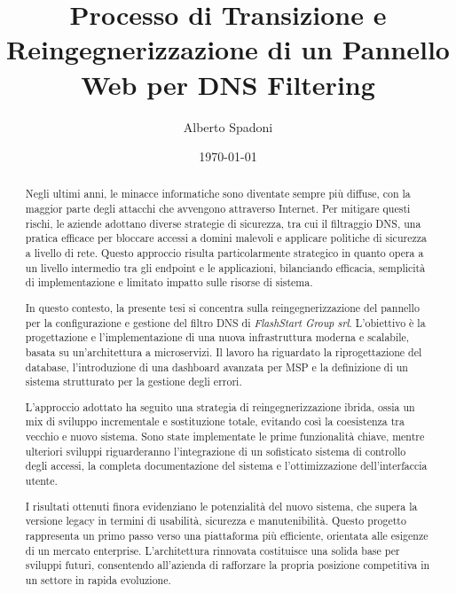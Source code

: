 \documentclass[12pt,a4paper,openright,twoside]{book}
\title{Processo di Transizione e Reingegnerizzazione di un Pannello Web per DNS Filtering}
\author{Alberto Spadoni}
\date{\today}
\begin{document}
\frontmatter\frontispiece

\renewcommand{\abstractname}{Abstract} %

\begin{abstract}
  Negli ultimi anni, le minacce informatiche sono diventate sempre più diffuse, con la maggior parte degli attacchi che avvengono attraverso Internet. Per mitigare questi rischi, le aziende adottano diverse strategie di sicurezza, tra cui il filtraggio DNS, una pratica efficace per bloccare accessi a domini malevoli e applicare politiche di sicurezza a livello di rete. Questo approccio risulta particolarmente strategico in quanto opera a un livello intermedio tra gli endpoint e le applicazioni, bilanciando efficacia, semplicità di implementazione e limitato impatto sulle risorse di sistema.

  \medskip

  In questo contesto, la presente tesi si concentra sulla reingegnerizzazione del pannello per la configurazione e gestione del filtro DNS di \textit{FlashStart Group srl}. L'obiettivo è la progettazione e l’implementazione di una nuova infrastruttura moderna e scalabile, basata su un’architettura a microservizi. Il lavoro ha riguardato la riprogettazione del database, l’introduzione di una dashboard avanzata per MSP e la definizione di un sistema strutturato per la gestione degli errori.

  \medskip

  L’approccio adottato ha seguito una strategia di reingegnerizzazione ibrida, ossia un mix di sviluppo incrementale e sostituzione totale, evitando così la coesistenza tra vecchio e nuovo sistema. Sono state implementate le prime funzionalità chiave, mentre ulteriori sviluppi riguarderanno l’integrazione di un sofisticato sistema di controllo degli accessi, la completa documentazione del sistema e l’ottimizzazione dell’interfaccia utente.

  \medskip

  I risultati ottenuti finora evidenziano le potenzialità del nuovo sistema, che supera la versione legacy in termini di usabilità, sicurezza e manutenibilità. Questo progetto rappresenta un primo passo verso una piattaforma più efficiente, orientata alle esigenze di un mercato enterprise. L'architettura rinnovata costituisce una solida base per sviluppi futuri, consentendo all’azienda di rafforzare la propria posizione competitiva in un settore in rapida evoluzione.
\end{abstract}
\end{document}
